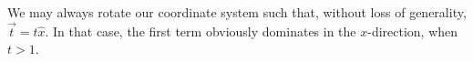 \begin{Proof}
  We may always rotate our coordinate system such that, without loss of generality, \(\vec{t} = t \hat{x}\).
  In that case, the first term obviously dominates in the \(x\)-direction, when $t>1$.
\end{Proof}


